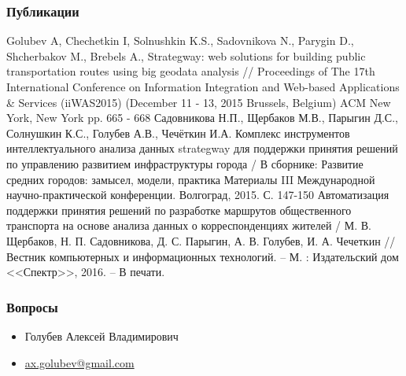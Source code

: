 \begin{frame}
    \frametitle{Публикации}
    \scriptsize
    \begin{thebibliography}{10}
         Golubev A, Chechetkin I, Solnushkin K.S., Sadovnikova N., Parygin D., Shcherbakov M., 
            Brebels A., Strategway: web solutions for building public transportation routes using big geodata 
            analysis // Proceedings of The 17th International Conference on Information Integration and 
            Web-based Applications \& Services (iiWAS2015) (December 11 - 13, 2015 Brussels, Belgium) 
            ACM New York, New York pp. 665 - 668
         Садовникова Н.П., Щербаков М.В., Парыгин Д.С., Солнушкин К.С., Голубев А.В., 
            Чечёткин И.А. Комплекс инструментов интеллектуального анализа данных strategway для поддержки 
            принятия решений по управлению развитием инфраструктуры города / В сборнике: Развитие средних 
            городов: замысел, модели, практика Материалы III Международной научно-практической конференции. Волгоград, 2015. С. 147-150
         Автоматизация поддержки принятия решений по разработке маршрутов общественного 
            транспорта на основе анализа данных о корреспонденциях жителей / М. В. Щербаков, 
            Н. П. Садовникова, Д. С. Парыгин, А. В. Голубев, И. А. Чечеткин // Вестник компьютерных и 
            информационных технологий. -- М. : Издательский дом <<Спектр>>, 2016. -- В печати.
    \end{thebibliography}
\end{frame}

\begin{frame}
    \frametitle{Вопросы}
    \begin{itemize}
        \item Голубев Алексей Владимирович
        \item \href{mailto:ax.golubev@gmail.com}{ax.golubev@gmail.com}
    \end{itemize}
\end{frame}